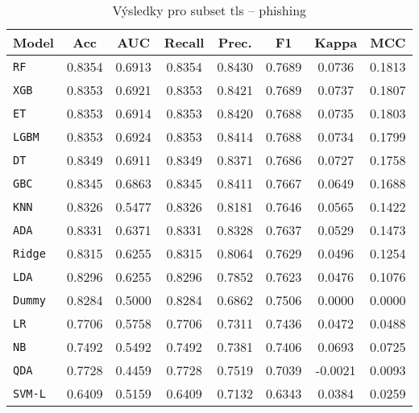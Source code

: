 \begin{table}[H]
  \centering
  \small
  \caption{Výsledky pro subset tls – phishing}
  \begin{tabular}{|l|c|c|c|c|c|c|c|}
    \hline
    \textbf{Model} & \textbf{Acc} & \textbf{AUC} & \textbf{Recall} & \textbf{Prec.} & \textbf{F1} & \textbf{Kappa} & \textbf{MCC} \\
    \hline
    \texttt{RF} & 0.8354 & 0.6913 & 0.8354 & 0.8430 & 0.7689 & 0.0736 & 0.1813 \\
    \texttt{XGB} & 0.8353 & 0.6921 & 0.8353 & 0.8421 & 0.7689 & 0.0737 & 0.1807 \\
    \texttt{ET} & 0.8353 & 0.6914 & 0.8353 & 0.8420 & 0.7688 & 0.0735 & 0.1803 \\
    \texttt{LGBM} & 0.8353 & 0.6924 & 0.8353 & 0.8414 & 0.7688 & 0.0734 & 0.1799 \\
    \texttt{DT} & 0.8349 & 0.6911 & 0.8349 & 0.8371 & 0.7686 & 0.0727 & 0.1758 \\
    \texttt{GBC} & 0.8345 & 0.6863 & 0.8345 & 0.8411 & 0.7667 & 0.0649 & 0.1688 \\
    \texttt{KNN} & 0.8326 & 0.5477 & 0.8326 & 0.8181 & 0.7646 & 0.0565 & 0.1422 \\
    \texttt{ADA} & 0.8331 & 0.6371 & 0.8331 & 0.8328 & 0.7637 & 0.0529 & 0.1473 \\
    \texttt{Ridge} & 0.8315 & 0.6255 & 0.8315 & 0.8064 & 0.7629 & 0.0496 & 0.1254 \\
    \texttt{LDA} & 0.8296 & 0.6255 & 0.8296 & 0.7852 & 0.7623 & 0.0476 & 0.1076 \\
    \texttt{Dummy} & 0.8284 & 0.5000 & 0.8284 & 0.6862 & 0.7506 & 0.0000 & 0.0000 \\
    \texttt{LR} & 0.7706 & 0.5758 & 0.7706 & 0.7311 & 0.7436 & 0.0472 & 0.0488 \\
    \texttt{NB} & 0.7492 & 0.5492 & 0.7492 & 0.7381 & 0.7406 & 0.0693 & 0.0725 \\
    \texttt{QDA} & 0.7728 & 0.4459 & 0.7728 & 0.7519 & 0.7039 & -0.0021 & 0.0093 \\
    \texttt{SVM-L} & 0.6409 & 0.5159 & 0.6409 & 0.7132 & 0.6343 & 0.0384 & 0.0259 \\
    \hline
  \end{tabular}
\end{table}
\vspace{0.5cm}